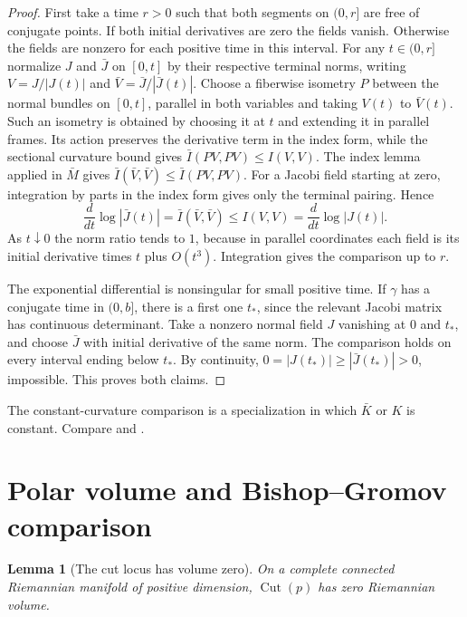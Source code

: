 \documentclass[11pt,oneside,openany]{book}
\theoremstyle{plain}
\newtheorem{lemma}[theorem]{Lemma}
\theoremstyle{definition}
\theoremstyle{remark}
\begin{document}
\begin{proof}
First take a time \(r>0\) such that both segments on \((0,r]\)
are free of conjugate points. If both initial derivatives
are zero the fields vanish. Otherwise the fields are nonzero
for each positive time in this interval. For any \(t\in(0,r]\)
normalize \(J\) and \(\bar J\) on \([0,t]\) by their respective
terminal norms, writing \(V=J/|J(t)|\) and
\(\bar V=\bar J/|\bar J(t)|\). Choose a fiberwise isometry \(P\)
between the normal bundles on \([0,t]\), parallel in both
variables and taking \(V(t)\) to \(\bar V(t)\). Such an isometry
is obtained by choosing it at \(t\) and extending it in
parallel frames. Its action preserves the derivative term in
the index form, while the sectional curvature bound gives
\(\bar I(PV,PV)\le I(V,V)\). The index lemma applied in
\(\bar M\) gives \(\bar I(\bar V,\bar V)\le \bar I(PV,PV)\).
For a Jacobi field starting at zero, integration by parts
in the index form gives only the terminal pairing. Hence
\[
 \frac{d}{dt}\log|\bar J(t)|=\bar I(\bar V,\bar V)
       \le I(V,V)=\frac{d}{dt}\log|J(t)|.
\]
As \(t\downarrow0\) the norm ratio tends to \(1\), because
in parallel coordinates each field is its initial derivative
times \(t\) plus \(O(t^3)\). Integration gives the comparison
up to \(r\).

The exponential differential is nonsingular for small
positive time. If \(\gamma\) has a conjugate time in
\((0,b]\), there is a first one \(t_*\), since the relevant
Jacobi matrix has continuous determinant. Take a nonzero
normal field \(J\) vanishing at \(0\) and \(t_*\), and choose
\(\bar J\) with initial derivative of the same norm.
The comparison holds on every interval ending below \(t_*\).
By continuity, \(0=|J(t_*)|\ge|\bar J(t_*)|>0\), impossible.
This proves both claims.
\end{proof}

The constant-curvature comparison is a specialization in
which \(\bar K\) or \(K\) is constant. Compare
\cite[Chapter 11, Proposition 11.3 and Theorem 11.9]{LeeRM}
and \cite[Chapter 10]{dC}.

\section{Polar volume and Bishop--Gromov comparison}
\label{p202:G21}

\begin{lemma}[The cut locus has volume zero]\label{lem:p202-cut-null}
On a complete connected Riemannian manifold of positive dimension,
\(\operatorname{Cut}(p)\) has zero Riemannian volume.
\end{lemma}
\end{document}

